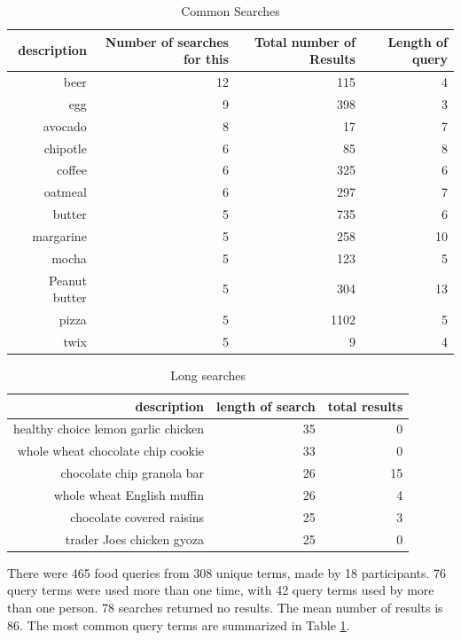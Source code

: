 \begin{table}[tbhp]
\small
  \centering
  \caption{Common Searches}
    \begin{tabular}{rrrr}
    \toprule
    description & Number of searches for this & Total number of Results & Length of query \\
    \midrule
    beer  & 12    & 115   & 4 \\
    egg   & 9     & 398   & 3 \\
    avocado & 8     & 17    & 7 \\
    chipotle & 6     & 85    & 8 \\
    coffee & 6     & 325   & 6 \\
    oatmeal & 6     & 297   & 7 \\
    butter & 5     & 735   & 6 \\
    margarine  & 5     & 258   & 10 \\
    mocha & 5     & 123   & 5 \\
    Peanut butter & 5     & 304   & 13 \\
    pizza & 5     & 1102  & 5 \\
    twix  & 5     & 9     & 4 \\
    \bottomrule
    \end{tabular}%
  \label{tab:insituCommonQueries}%
\end{table}%


\begin{table}[tbhp]
\small
  \centering
  \caption{Long searches}
    \begin{tabular}{rrr}
    \toprule
    description & length of search & total results \\
    \midrule
    healthy choice lemon garlic chicken & 35    & 0 \\
    whole wheat chocolate chip cookie & 33    & 0 \\
    chocolate chip granola bar & 26    & 15 \\
    whole wheat English muffin & 26    & 4 \\
    chocolate covered raisins & 25    & 3 \\
    trader Joes chicken gyoza & 25    & 0 \\
    \bottomrule
    \end{tabular}%
  \label{tab:insituLongQueries}%
\end{table}%


There were 465 food queries from 308 unique terms, made by 18 participants. 76 query terms were used more than one time, with 42 query terms used by more than one person. 78 searches returned no results. The mean number of results is 86. The most common query terms are summarized in Table \ref{tab:insituCommonQueries}.

